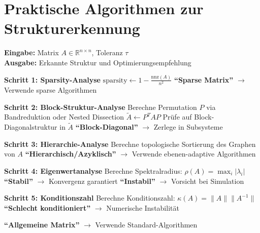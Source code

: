 \documentclass[a4paper,12pt]{report}
\theoremstyle{definition}
\begin{document}
	\section{Praktische Algorithmen zur Strukturerkennung}
	
	\begin{algorithm}[H]
		\caption{Automatische Strukturerkennung}
		\label{alg:structure-detection}
		\textbf{Eingabe:} Matrix $A \in \mathbb{R}^{n \times n}$, Toleranz $\tau$ \\
		\textbf{Ausgabe:} Erkannte Struktur und Optimierungsempfehlung
		\begin{algorithmic}[1]
			\State \textbf{Schritt 1: Sparsity-Analyse}
			\State $\text{sparsity} \gets 1 - \frac{\text{nnz}(A)}{n^2}$
			\State \Return \textbf{``Sparse Matrix''} $\rightarrow$ Verwende sparse Algorithmen
			\EndIf
			
			\State \textbf{Schritt 2: Block-Struktur-Analyse}
			\State Berechne Permutation $P$ via Bandreduktion oder Nested Dissection
			\State $\tilde{A} \gets P^T A P$
			\State Prüfe auf Block-Diagonalstruktur in $\tilde{A}$
			\State \Return \textbf{``Block-Diagonal''} $\rightarrow$ Zerlege in Subsysteme
			\EndIf
			
			\State \textbf{Schritt 3: Hierarchie-Analyse}
			\State Berechne topologische Sortierung des Graphen von $A$
			\State \Return \textbf{``Hierarchisch/Azyklisch''} $\rightarrow$ Verwende ebenen-adaptive Algorithmen
			\EndIf
			
			\State \textbf{Schritt 4: Eigenwertanalyse}
			\State Berechne Spektralradius: $\rho(A) = \max_i |\lambda_i|$
			\State \Return \textbf{``Stabil''} $\rightarrow$ Konvergenz garantiert
			\Else
			\State \Return \textbf{``Instabil''} $\rightarrow$ Vorsicht bei Simulation
			\EndIf
			
			\State \textbf{Schritt 5: Konditionszahl}
			\State Berechne Konditionszahl: $\kappa(A) = \|A\| \|A^{-1}\|$
			\State \Return \textbf{``Schlecht konditioniert''} $\rightarrow$ Numerische Instabilität
			\EndIf
			
			\State \Return \textbf{``Allgemeine Matrix''} $\rightarrow$ Verwende Standard-Algorithmen
		\end{algorithmic}
	\end{algorithm}
\end{document}
